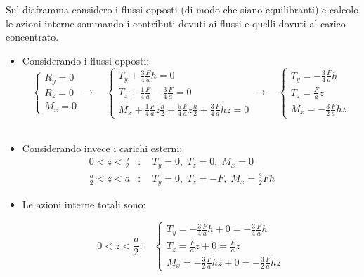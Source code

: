 \begin{esempioBox}
    Sul diaframma considero i flussi opposti (di modo che siano equilibranti) e calcolo le azioni interne sommando i contributi dovuti ai flussi e quelli dovuti al carico concentrato.
    \begin{itemize}
        \item Considerando i flussi opposti:
        \begin{equation*}
            \begin{cases}
                R_y=0\\R_z=0\\M_x=0
            \end{cases}
            \rightarrow\quad
            \begin{cases}
                T_y+\frac{3}{4}\frac{F}{a} h=0\\
                T_z +\frac{1}{4}\frac{F}{a}    -\frac{3}{4}\frac{F}{a} =0\\
                M_x +\frac{1}{4}\frac{F}{a} z\frac{h}{2} + \frac{5}{4}\frac{F}{a}z\frac{h}{2} +\frac{3}{4}\frac{F}{a}hz=0
            \end{cases}
            \rightarrow\quad
            \begin{cases}
                T_y =-\frac{3}{4}\frac{F}{a}h\\
                T_z  =\frac{F}{a}  z\\
                M_x = - \frac{3}{2}\frac{F}{a}hz
            \end{cases}
        \end{equation*}\\
        \item Considerando invece i carichi esterni:
        \begin{align*}
    0<z<\frac{a}{2}&: \quad T_y = 0, \; T_z = 0, \; M_x = 0 
    \qquad\qquad\\
    \frac{a}{2}<z<a&: \quad T_y = 0, \; T_z = -F, \; M_x = \frac{3}{2}Fh
\end{align*}
\item Le azioni interne totali sono:


\begin{equation*}
    0<z<\frac{a}{2}: \quad 
    \begin{cases}
        T_y = -\frac{3}{4}\frac{F}{a}h + 0 = -\frac{3}{4}\frac{F}{a}h \\
        T_z = \frac{F}{a}z + 0 = \frac{F}{a}z \\
        M_x = -\frac{3}{2}\frac{F}{a}hz + 0 = -\frac{3}{2}\frac{F}{a}hz
    \end{cases}
\end{equation*}


\end{itemize}
\end{esempioBox}
